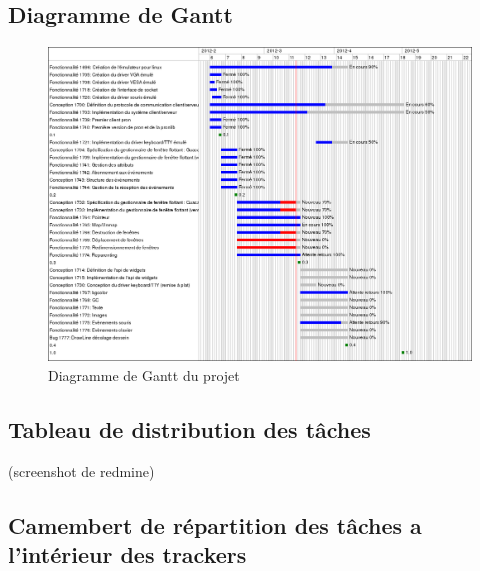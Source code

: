 \subsection{Diagramme de Gantt}

\begin{figure}[H]
  \centering
    \includegraphics[width=18cm]{tacos-gui-gantt}
  \caption{Diagramme de Gantt du projet}
  \label{fig:diagGant}
\end{figure}

\subsection{Tableau de distribution des tâches}
(screenshot de redmine)
\subsection{Camembert de répartition des tâches a l'intérieur des trackers}

